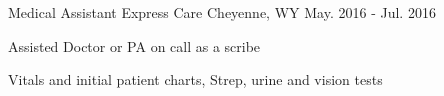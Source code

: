 \begin{cventries}
  \cventry
    {Medical Assistant} %
    {Express Care} %
    {Cheyenne, WY} %
    {May. 2016 - Jul. 2016} %
    {
      \begin{cvitems} %
        \item {Assisted Doctor or PA on call as a scribe}
        \item {Vitals and initial patient charts, Strep, urine and vision tests}
      \end{cvitems}
    }




\end{cventries}
